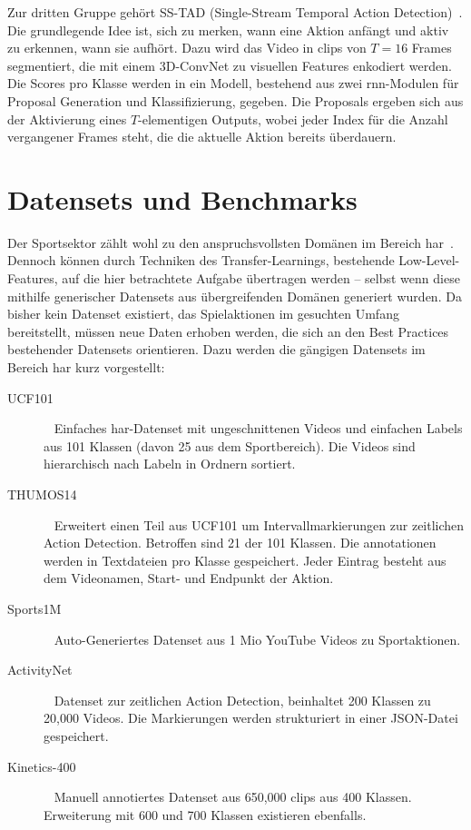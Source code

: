 Zur dritten Gruppe gehört \ua SS-TAD (Single-Stream Temporal Action Detection)~\cite{Buch17}.
Die grundlegende Idee ist, sich zu merken, wann eine Aktion anfängt und aktiv zu erkennen, wann sie aufhört.
Dazu wird das Video in \glspl{clip} von $T=16$ Frames segmentiert, die mit einem 3D-ConvNet zu visuellen Features enkodiert werden.
Die Scores pro Klasse werden in ein Modell, bestehend aus zwei \gls{rnn}-Modulen für Proposal Generation und Klassifizierung, gegeben.
Die Proposals ergeben sich aus der Aktivierung eines $T$-elementigen Outputs, wobei jeder Index für die Anzahl vergangener Frames steht, die die aktuelle Aktion bereits überdauern.

\section{Datensets und Benchmarks}
\label{sec:datensets-und-benchmarks}

Der Sportsektor zählt wohl zu den anspruchsvollsten Domänen im Bereich \gls{har}~\cite{Sozykin17}.
Dennoch können durch Techniken des Transfer-Learnings, bestehende Low-Level-Features, auf die hier betrachtete Aufgabe übertragen werden -- selbst wenn diese mithilfe generischer Datensets aus übergreifenden Domänen generiert wurden.
Da bisher kein Datenset existiert, das Spielaktionen im gesuchten Umfang bereitstellt, müssen neue Daten erhoben werden, die sich an den Best Practices bestehender Datensets orientieren.
Dazu werden die gängigen Datensets im Bereich \gls{har} kurz vorgestellt:

\begin{description}
    \item[UCF101]~\cite{Soomro12} Einfaches \gls{har}-Datenset mit ungeschnittenen Videos und einfachen Labels aus 101 Klassen (davon 25 aus dem Sportbereich).
    Die Videos sind hierarchisch nach Labeln in Ordnern sortiert.
    \item[THUMOS14]~\cite{THUMOS14} Erweitert einen Teil aus UCF101 um Intervallmarkierungen zur zeitlichen Action Detection.
    Betroffen sind 21 der 101 Klassen.
    Die \gls{annotationen} werden in Textdateien pro Klasse gespeichert.
    Jeder Eintrag besteht aus dem Videonamen, Start- und Endpunkt der Aktion.
    \item[Sports1M]~\cite{Karpathy14} Auto-Generiertes Datenset aus 1 Mio YouTube Videos zu Sportaktionen.
    \item[ActivityNet]~\cite{Caba15} Datenset zur zeitlichen Action Detection, beinhaltet 200 Klassen zu 20,000 Videos.
    Die Markierungen werden strukturiert in einer JSON-Datei gespeichert.
    \item[Kinetics-400]~\cite{Kay17} Manuell annotiertes Datenset aus 650,000 \glspl{clip} aus 400 Klassen.
    Erweiterung mit 600 und 700 Klassen existieren ebenfalls.
\end{description}

